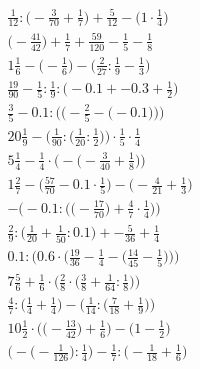 \documentclass[8pt]{article}
\begin{document}
\begin{align}
\frac{1}{12} : \big(-\frac{3}{70} + \frac{1}{7}\big) + \frac{5}{12} - \big(1 \cdot \frac{1}{4}\big) \\
\big(-\frac{41}{42}\big) + \frac{1}{7} + \frac{59}{120} - \frac{1}{5} - \frac{1}{8} \\
1\frac{1}{6} - \big(-\frac{1}{6}\big) - \big(\frac{2}{27} : \frac{1}{9} - \frac{1}{3}\big) \\
\frac{19}{90} - \frac{1}{5} : \frac{1}{9} : \big(-0.1 + -0.3 + \frac{1}{2}\big) \\
\frac{3}{5} - 0.1 : \bigg(\Big(-\frac{2}{5} - \big(-0.1\big)\Big)\bigg) \\
20\frac{1}{9} - \Big(\frac{1}{90} : \big(\frac{1}{20} : \frac{1}{2}\big)\Big) \cdot \frac{1}{5} \cdot \frac{1}{4} \\
5\frac{1}{4} - \frac{1}{4} \cdot \Big(-\big(-\frac{3}{40} + \frac{1}{8}\big)\Big) \\
1\frac{2}{7} - \big(\frac{57}{70} - 0.1 \cdot \frac{1}{5}\big) - \big(-\frac{4}{21} + \frac{1}{3}\big) \\
-\bigg(-0.1 : \Big(\big(-\frac{17}{70}\big) + \frac{4}{7} \cdot \frac{1}{4}\Big)\bigg) \\
\frac{2}{9} : \big(\frac{1}{20} + \frac{1}{50} : 0.1\big) + -\frac{5}{36} + \frac{1}{4} \\
0.1 : \bigg(0.6 \cdot \Big(\frac{19}{36} - \frac{1}{4} - \big(\frac{14}{45} - \frac{1}{5}\big)\Big)\bigg) \\
7\frac{5}{6} + \frac{1}{6} \cdot \Big(\frac{2}{8} \cdot \big(\frac{3}{8} + \frac{1}{64} : \frac{1}{8}\big)\Big) \\
\frac{4}{7} : \Big(\frac{1}{4} + \frac{1}{4}\Big) - \Big(\frac{1}{14} : \big(\frac{7}{18} + \frac{1}{9}\big)\Big) \\
10\frac{1}{2} \cdot \Big(\big(-\frac{13}{42}\big) + \frac{1}{6}\Big) - \Big(1 - \frac{1}{2}\Big) \\
\Big(-\big(-\frac{1}{126}\big) : \frac{1}{4}\Big) - \frac{1}{7} : \Big(-\frac{1}{18} + \frac{1}{6}\Big)
\end{align}
\end{document}

